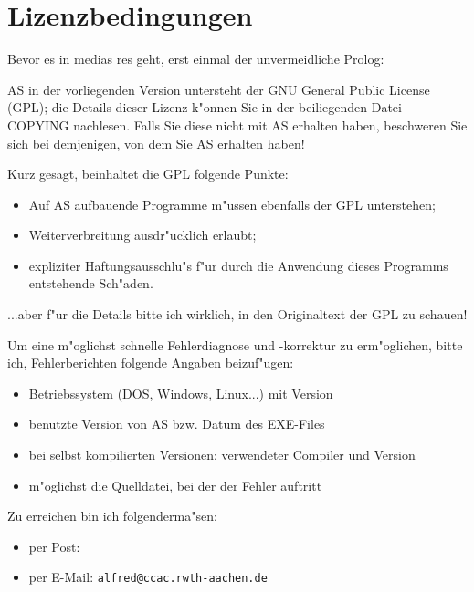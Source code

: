 \documentclass[12pt,a4paper,twoside]{report}
\newcommand{\tty}[1]{{\tt #1}}
\newcommand{\asname}{AS}
\begin{document}

\section{Lizenzbedingungen}
\label{SectLicense}

Bevor es in medias res geht, erst einmal der unvermeidliche Prolog:
\par
\asname{} in der vorliegenden Version untersteht der GNU General Public License
(GPL); die Details dieser Lizenz k"onnen Sie in der beiliegenden Datei
COPYING nachlesen.  Falls Sie diese nicht mit \asname{} erhalten haben,
beschweren Sie sich bei demjenigen, von dem Sie \asname{} erhalten haben!
\par
Kurz gesagt, beinhaltet die GPL folgende Punkte:
\begin{itemize}
\item{Auf \asname{} aufbauende Programme m"ussen ebenfalls der GPL unterstehen;}
\item{Weiterverbreitung ausdr"ucklich erlaubt;}
\item{expliziter Haftungsausschlu"s f"ur durch die Anwendung dieses
      Programms entstehende Sch"aden.}
\end{itemize}
...aber f"ur die Details bitte ich wirklich, in den Originaltext der GPL
zu schauen!
\par
Um eine m"oglichst schnelle Fehlerdiagnose und -korrektur zu erm"oglichen,
bitte ich, Fehlerberichten folgende Angaben beizuf"ugen:
\begin{itemize}
\item{Betriebssystem (DOS, Windows, Linux...) mit Version}
\item{benutzte Version von \asname{} bzw. Datum des EXE-Files}
\item{bei selbst kompilierten Versionen: verwendeter Compiler und Version}
\item{m"oglichst die Quelldatei, bei der der Fehler auftritt}
\end{itemize}
Zu erreichen bin ich folgenderma"sen:
\begin{itemize}
\item{per Post: }
\item{per E-Mail: \tty{alfred@ccac.rwth-aachen.de}}
\end{itemize}
\end{document}
